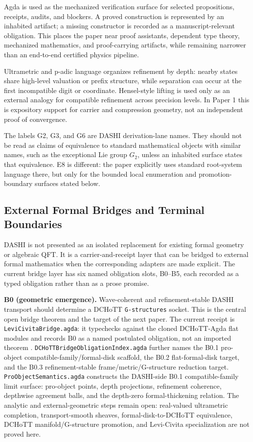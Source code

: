 \documentclass[11pt]{article}
\theoremstyle{definition}
\theoremstyle{plain}
\theoremstyle{remark}
\begin{document}
Agda is used as the mechanized verification surface for selected propositions,
receipts, audits, and blockers. A proved construction is represented by an
inhabited artifact; a missing constructor is recorded as a manuscript-relevant
obligation. This places the paper near proof assistants, dependent type theory,
mechanized mathematics, and proof-carrying artifacts, while remaining narrower
than an end-to-end certified physics pipeline.

Ultrametric and p-adic language organizes refinement by depth: nearby states
share high-level valuation or prefix structure, while separation can occur at
the first incompatible digit or coordinate. Hensel-style lifting is used only
as an external analogy for compatible refinement across precision levels. In
Paper 1 this is expository support for carrier and compression geometry, not
an independent proof of convergence.

The labels G2, G3, and G6 are DASHI derivation-lane names. They should not be
read as claims of equivalence to standard mathematical objects with similar
names, such as the exceptional Lie group \(G_2\), unless an inhabited surface
states that equivalence. E8 is different: the paper explicitly uses standard
root-system language there, but only for the bounded local enumeration and
promotion-boundary surfaces stated below.

\subsection*{External Formal Bridges and Terminal Boundaries}

DASHI is not presented as an isolated replacement for existing formal
geometry or algebraic QFT. It is a carrier-and-receipt layer that can be
bridged to external formal mathematics when the corresponding adapters are
made explicit. The current bridge layer has six named obligation slots,
B0--B5, each recorded as a typed obligation rather than as a prose promise.

\textbf{B0 (geometric emergence).} Wave-coherent and refinement-stable DASHI
transport should determine a DCHoTT \texttt{G-structures} socket. This is the
central open bridge theorem and the target of the next paper. The current
receipt is \texttt{LeviCivitaBridge.agda}: it typechecks against the cloned
DCHoTT-Agda flat modules and records B0 as a named postulated obligation, not
an imported theorem \cite{wellen-2018,dchott-agda}.
\texttt{DCHoTTBridgeObligationIndex.agda} further names the B0.1 pro-object
compatible-family/formal-disk scaffold, the B0.2 flat-formal-disk target, and
the B0.3 refinement-stable frame/metric/G-structure reduction target.
\texttt{ProObjectSemantics.agda} constructs the DASHI-side B0.1
compatible-family limit surface: pro-object points, depth projections,
refinement coherence, depthwise agreement balls, and the depth-zero
formal-thickening relation. The analytic and external-geometric steps remain
open: real-valued ultrametric completion, transport-smooth sheaves,
formal-disk-to-DCHoTT equivalence, DCHoTT manifold/G-structure promotion, and
Levi-Civita specialization are not proved here.
\end{document}
